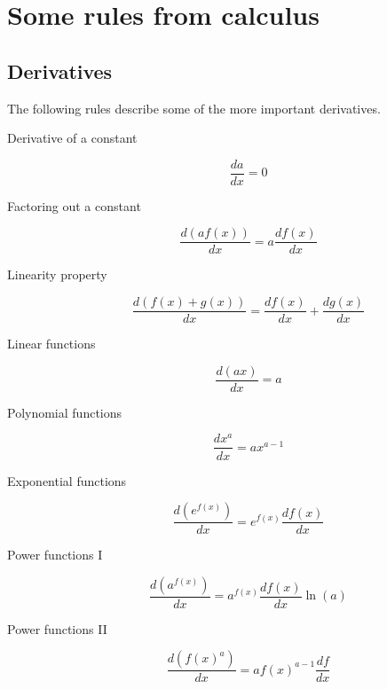 \chapter{Some rules from calculus}

\section{Derivatives}
The following rules describe some of the more important derivatives.

\begin{description}
	\item[Derivative of a constant]
		\begin{equation}
			\frac{da}{dx} = 0
		\end{equation}
	
	\item[Factoring out a constant]
		\begin{equation}
			\frac{d\left(a f(x)\right)}{dx} = a \frac{d f(x)}{dx}
		\end{equation}
		
	\item[Linearity property]
		\begin{equation}
			\frac{d\left( f(x) + g(x) \right)}{dx} = \frac{df(x)}{dx} + \frac{dg(x)}{dx}
		\end{equation}
		
	\item[Linear functions]
		\begin{equation}
			\frac{d(ax)}{dx} = a
		\end{equation}
		
	\item[Polynomial functions]
		\begin{equation}
			\frac{dx^a}{dx} = a x^{a-1}
		\end{equation}
		
	\item[Exponential functions]
		\begin{equation}
			\frac{d\left( e^{f(x)} \right)}{dx} = e^{f(x)} \frac{df(x)}{dx}
		\end{equation}
		
	\item[Power functions I]
		\begin{equation}
			\frac{d\left( a^{f(x)} \right)}{dx} = a^{f(x)} \frac{d f(x)}{dx} \ln(a)
		\end{equation}
		
	\item[Power functions II]
		\begin{equation}
			\frac{d\left( f(x)^a \right)}{dx} = a f(x)^{a-1} \frac{df}{dx}
		\end{equation}
		

\end{description}
